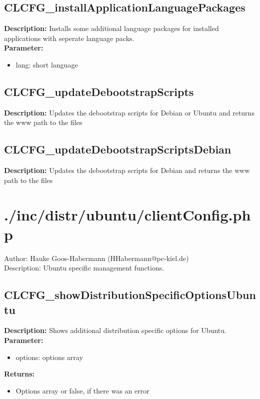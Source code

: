 \subsection{CLCFG\_installApplicationLanguagePackages}
\textbf{Description:} Installs some additional language packages for installed applications with seperate language packs.\\
\textbf{Parameter:}
\begin{itemize}
\item lang: short language
\end{itemize}

\subsection{CLCFG\_updateDebootstrapScripts}
\textbf{Description:} Updates the debootstrap scripts for Debian or Ubuntu and returns the www path to the files\\

\subsection{CLCFG\_updateDebootstrapScriptsDebian}
\textbf{Description:} Updates the debootstrap scripts for Debian and returns the www path to the files\\

\newpage\section{./inc/distr/ubuntu/clientConfig.php}
 Author: Hauke Goos-Habermann (HHabermann@pc-kiel.de)\\
 Description: Ubuntu specific management functions.\\

\subsection{CLCFG\_showDistributionSpecificOptionsUbuntu}
\textbf{Description:} Shows additional distribution specific options for Ubuntu.\\
\textbf{Parameter:}
\begin{itemize}
\item options: options array
\end{itemize}
\textbf{Returns:}
\begin{itemize}
\item Options array or false, if there was an error
\end{itemize}


